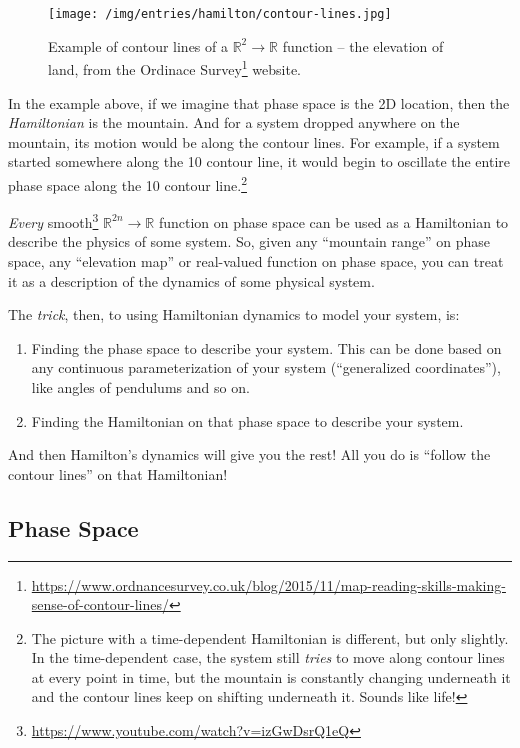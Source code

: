 \documentclass[]{article}
\renewcommand{\href}[2]{#2\footnote{\url{#1}}}
\begin{document}
\begin{figure}
\centering
\texttt{[image: /img/entries/hamilton/contour-lines.jpg]}
\caption{Example of contour lines of a \(\mathbb{R}^2 \rightarrow \mathbb{R}\)
function -- the elevation of land, from the
\href{https://www.ordnancesurvey.co.uk/blog/2015/11/map-reading-skills-making-sense-of-contour-lines/}{Ordinace
Survey} website.}
\end{figure}

In the example above, if we imagine that phase space is the 2D location, then
the \emph{Hamiltonian} is the mountain. And for a system dropped anywhere on the
mountain, its motion would be along the contour lines. For example, if a system
started somewhere along the 10 contour line, it would begin to oscillate the
entire phase space along the 10 contour line.\footnote{The picture with a
  time-dependent Hamiltonian is different, but only slightly. In the
  time-dependent case, the system still \emph{tries} to move along contour lines
  at every point in time, but the mountain is constantly changing underneath it
  and the contour lines keep on shifting underneath it. Sounds like life!}

\emph{Every} \href{https://www.youtube.com/watch?v=izGwDsrQ1eQ}{smooth}
\(\mathbb{R}^{2n} \rightarrow \mathbb{R}\) function on phase space can be used
as a Hamiltonian to describe the physics of some system. So, given any
``mountain range'' on phase space, any ``elevation map'' or real-valued function
on phase space, you can treat it as a description of the dynamics of some
physical system.

The \emph{trick}, then, to using Hamiltonian dynamics to model your system, is:

\begin{enumerate}
\def\labelenumi{\arabic{enumi}.}
\item
  Finding the phase space to describe your system. This can be done based on any
  continuous parameterization of your system (``generalized coordinates''), like
  angles of pendulums and so on.
\item
  Finding the Hamiltonian on that phase space to describe your system.
\end{enumerate}

And then Hamilton's dynamics will give you the rest! All you do is ``follow the
contour lines'' on that Hamiltonian!

\subsection{Phase Space}\label{phase-space}
\end{document}
